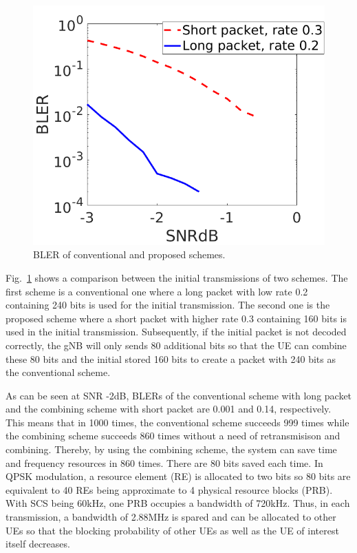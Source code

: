 \documentclass[conference,10pt]{IEEEtran}
\begin{document}
\begin{figure}[htb]
\centerline{\includegraphics[scale=0.3]{fig8.png}}
\caption{BLER of conventional and proposed schemes.}
\label{fig8}
\end{figure}

Fig.~\ref{fig8} shows a comparison between the initial transmissions of two schemes. The first scheme is a conventional one where a long packet with low rate 0.2 containing 240 bits is used for the initial transmission. The second one is the proposed scheme where a short packet with higher rate 0.3 containing 160 bits is used in the initial transmission. Subsequently, if the initial packet is not decoded correctly, the gNB will only sends 80 additional bits so that the UE can combine these 80 bits and the initial stored 160 bits to create a packet with 240 bits as the conventional scheme. 

As can be seen at SNR -2dB, BLERs of the conventional scheme with long packet and the combining scheme with short packet are 0.001 and 0.14, respectively. This means that in 1000 times, the conventional scheme succeeds 999 times while the combining scheme succeeds 860 times without a need of retransmisison and combining. Thereby, by using the combining scheme, the system can save time and frequency resources in 860 times. There are 80 bits saved each time. In QPSK modulation, a resource element (RE) is allocated to two bits so 80 bits are equivalent to 40 REs being approximate to 4 physical resource blocks (PRB). With SCS being 60kHz, one PRB occupies a bandwidth of 720kHz. Thus, in each transmission, a bandwidth of 2.88MHz is spared and can be allocated to other UEs so that the blocking probability of other UEs as well as the UE of interest itself decreases.
\end{document}

